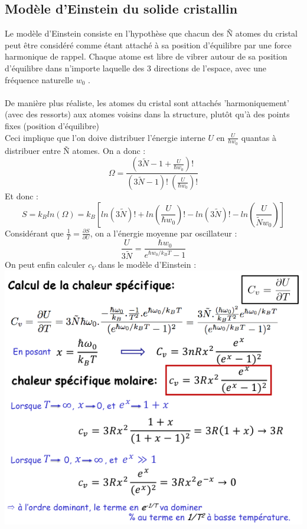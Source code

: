 \documentclass{article}
\begin{document}
        \subsection{Modèle d'Einstein du solide cristallin}
            Le modèle d’Einstein consiste en l’hypothèse que chacun des
            Ñ atomes du cristal peut être considéré comme étant attaché à sa position
            d’équilibre par une force harmonique de rappel.
            Chaque atome est libre de vibrer autour de sa
            position d’équilibre dans n’importe laquelle des
            3 directions de l’espace, avec une fréquence
            naturelle $w_0$ . \\\\
            De manière plus réaliste, les atomes du cristal sont attachés 'harmoniquement' (avec des ressorts) aux atomes voisins dans la structure, plutôt
            qu’à des points fixes (position d’équilibre) \\
            Ceci implique que l'on doive distribuer l'énergie interne $U$ en $\frac{U}{\hbar w_0}$ quantas à distribuer entre Ñ atomes.
            On a donc :
            $$
            \Omega = \frac{(3 \tilde N - 1 + \frac{U}{\hbar w_0})!}{(3 \tilde N -1)! \: (\frac{U}{\hbar w_0})!}
            $$
            Et donc :
            $$
            S = k_B ln(\Omega) = k_B [ln(3 \tilde N)! + ln(\frac{U}{\hbar w_0})! - ln(3 \tilde N)! - ln(\frac{U}{\tilde N w_0})]
            $$
            Considérant que $\frac{1}{T} = \frac{\partial S}{\partial U}$, on a l'énergie moyenne par oscillateur :
            $$
            \frac{U}{3 \tilde N} = \frac{\hbar w_0}{e^{\hbar w_0 / k_B T} - 1}
            $$
            On peut enfin calculer $c_V$ dans le modèle d'Einstein : \\
            \includegraphics[scale = .5]{c_v_einstein.png}
\pagebreak
\end{document}
